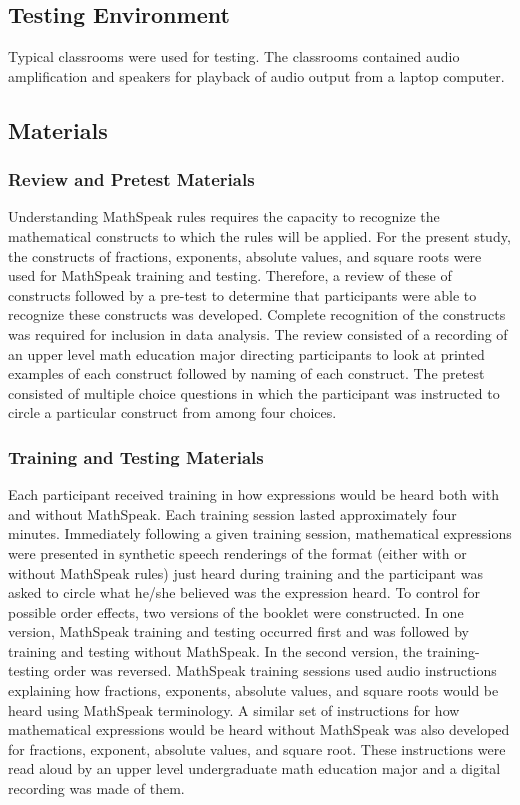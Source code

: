 \documentclass[11.5pt]{sig-alternate} %
\begin{document}
\begin{large}
\subsection*{Testing Environment}
Typical classrooms were used for testing. The classrooms contained audio amplification and speakers for playback of audio output from a laptop computer.

\subsection*{Materials}
\subsubsection*{Review and Pretest Materials}
Understanding MathSpeak rules requires the capacity to recognize the mathematical constructs to which the rules will be applied. For the present study, the constructs of fractions, exponents, absolute values, and square roots were used for MathSpeak training and testing. Therefore, a review of these of constructs followed by a pre-test to determine that participants were able to recognize these constructs was developed. Complete recognition of the constructs was required for inclusion in data analysis. The review consisted of a recording of an upper level math education major directing participants to look at printed examples of each construct followed by naming of each construct. The pretest consisted of multiple choice questions in which the participant was instructed to circle a particular construct from among four choices.

\subsubsection*{Training and Testing Materials}
Each participant received training in how expressions would be heard both with and without MathSpeak. Each training session lasted approximately four minutes. Immediately following a given training session, mathematical expressions were presented in synthetic speech renderings of the format (either with or without MathSpeak rules) just heard during training and the participant was asked to circle what he/she believed was the expression heard. To control for possible order effects, two versions of the booklet were constructed. In one version, MathSpeak training and testing occurred first and was followed by training and testing without MathSpeak. In the second version, the training-testing order was reversed. MathSpeak training sessions used audio instructions explaining how fractions, exponents, absolute values, and square roots would be heard using MathSpeak terminology. A similar set of instructions for how mathematical expressions would be heard without MathSpeak was also developed for fractions, exponent, absolute values, and square root. These instructions were read aloud by an upper level undergraduate math education major and a digital recording was made of them.


\end{large}
\end{document}

